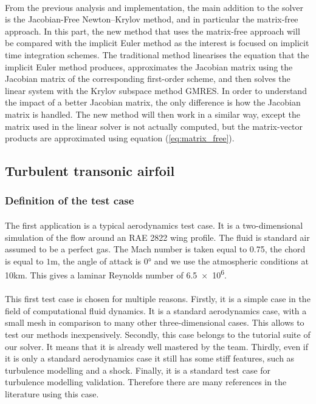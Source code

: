     \paragraph{}
    From the previous analysis and implementation, the main addition to the solver is the Jacobian-Free Newton--Krylov method, and in particular the matrix-free approach.
    In this part, the new method that uses the matrix-free approach will be compared with the implicit Euler method as the interest is focused on implicit time integration schemes.
    The traditional method linearises the equation that the implicit Euler method produces, approximates the Jacobian matrix using the Jacobian matrix of the corresponding first-order scheme, and then solves the linear system with the Krylov subspace method GMRES.
    In order to understand the impact of a better Jacobian matrix, the only difference is how the Jacobian matrix is handled.
    The new method will then work in a similar way, except the matrix used in the linear solver is not actually computed, but the matrix-vector products are approximated using equation (\ref{eq:matrix_free}).


    \subsection{Turbulent transonic airfoil}

      \subsubsection{Definition of the test case}

        \paragraph{}
        The first application is a typical aerodynamics test case.
        It is a two-dimensional simulation of the flow around an RAE 2822 wing profile.
        The fluid is standard air assumed to be a perfect gas.
        The Mach number is taken equal to 0.75, the chord is equal to $1\si{\meter}$, the angle of attack is $0\si{\degree}$ and we use the atmospheric conditions at 10km.
        This gives a laminar Reynolds number of \num{6.5e6}.

        \paragraph{}
        This first test case is chosen for multiple reasons.
        Firstly, it is a simple case in the field of computational fluid dynamics.
        It is a standard aerodynamics case, with a small mesh in comparison to many other three-dimensional cases.
        This allows to test our methods inexpensively.
        Secondly, this case belongs to the tutorial suite of our solver.
        It means that it is already well mastered by the team.
        Thirdly, even if it is only a standard aerodynamics case it still has some stiff features, such as turbulence modelling and a shock.
        Finally, it is a standard test case for turbulence modelling validation.
        Therefore there are many references in the literature using this case.

